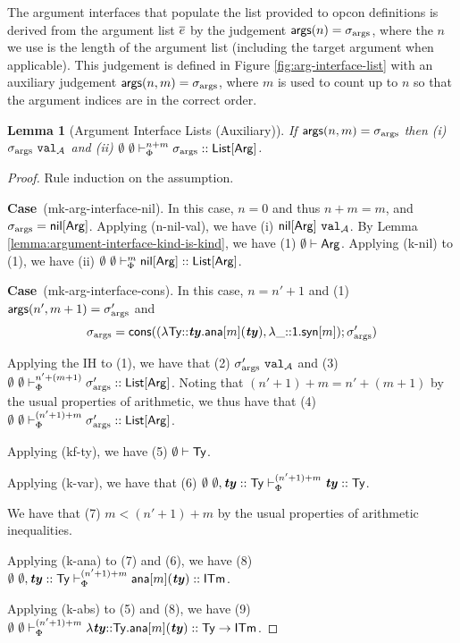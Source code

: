 \documentclass[12pt]{article}
\newtheorem{lemma}{Lemma}
\newcommand{\pfcase}[1]{\textbf{Case}~#1. }
\begin{document}
The argument interfaces that populate the list provided to opcon definitions is derived from the argument list $\overline{e}$ by the judgement ${\sf args}(n)= \sigma_\text{args}$, where the $n$ we use is the length of the argument list (including the target argument when applicable). This judgement is defined in Figure \ref{fig:arg-interface-list} with an auxiliary judgement ${\sf args}(n, m)=\sigma_\text{args}$, where $m$ is used to count up to $n$ so that the argument indices are in the correct order.

\begin{lemma}[Argument Interface Lists (Auxiliary)]
\label{lemma:argument-interface-lists-aux}
If ${\sf args}(n, m)=\sigma_\text{args}$ then (i) $\sigma_\text{args}~\mathtt{val}_{\mathcal{A}}$ and (ii) $\emptyset~\emptyset \vdash_{\Phi}^{n+m} \sigma_\text{args} :: {\sf List}[{\sf Arg}]$.
\end{lemma}
\begin{proof} Rule induction on the assumption.

\pfcase{(mk-arg-interface-nil)} In this case, $n=0$ and thus $n+m=m$, and $\sigma_\text{args}={\sf nil}[{\sf Arg}]$. Applying (n-nil-val), we have (i) ${\sf nil}[{\sf Arg}]~\mathtt{val}_{\mathcal{A}}$. By Lemma \ref{lemma:argument-interface-kind-is-kind}, we have (1) $\emptyset \vdash {\sf Arg}$. Applying (k-nil) to (1), we have (ii) $\emptyset~\emptyset \vdash_{\Phi}^{m} {\sf nil}[{\sf Arg}] :: {\sf List}[{\sf Arg}]$.

\pfcase{(mk-arg-interface-cons)} In this case, $n=n'+1$ and (1) ${\sf args}(n', m+1)=\sigma_\text{args}'$ and $$\sigma_\text{args}={\sf cons}((\lambda {\sf Ty}{::}{\textbf{\textit{ty}}}.{\sf ana}[m]({\textbf{\textit{ty}}}), \lambda \_{::}{\sf 1}.{\sf syn}[m]); \sigma_\text{args}')$$

Applying the IH to (1), we have that (2) $\sigma_\text{args}'~\mathtt{val}_{\mathcal{A}}$ and (3) $\emptyset~\emptyset \vdash_{\Phi}^{n'+(m+1)} \sigma_\text{args}' :: {\sf List}[{\sf Arg}]$. Noting that $(n'+1)+m=n'+(m+1)$ by the usual properties of arithmetic, we thus have that (4) $\emptyset~\emptyset \vdash_{\Phi}^{(n'+1)+m} \sigma_\text{args}' :: {\sf List}[{\sf Arg}]$.

Applying (kf-ty), we have (5) $\emptyset \vdash {\sf Ty}$.

Applying (k-var), we have that (6) $\emptyset~\emptyset, {\textbf{\textit{ty}}} :: {\sf Ty} \vdash_{\Phi}^{(n' + 1) + m} {\textbf{\textit{ty}}} :: {\sf Ty}$.

We have that (7) $m < (n' + 1) + m$ by the usual properties of arithmetic inequalities.

Applying (k-ana) to (7) and (6), we have (8) $\emptyset~\emptyset, {\textbf{\textit{ty}}} :: {\sf Ty} \vdash_{\Phi}^{(n' + 1) + m} {\sf ana}[m]({\textbf{\textit{ty}}}) :: {\sf ITm}$.

Applying (k-abs) to (5) and (8), we have (9) $\emptyset~\emptyset \vdash_{\Phi}^{(n'+1)+m} \lambda {\textbf{\textit{ty}}}{::}{\sf Ty}.{\sf ana}[m]({\textbf{\textit{ty}}}) :: {\sf Ty} \rightarrow {\sf ITm}$.


\end{proof}
\end{document}
